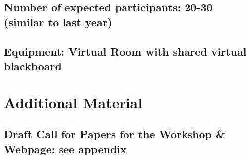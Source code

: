 \subsection{Number of expected participants: 20-30 (similar to last year)}

\subsection{Equipment: Virtual Room with shared virtual blackboard}

\section{Additional Material}

\subsection{Draft Call for Papers for the Workshop \& Webpage: see appendix}



\newpage



